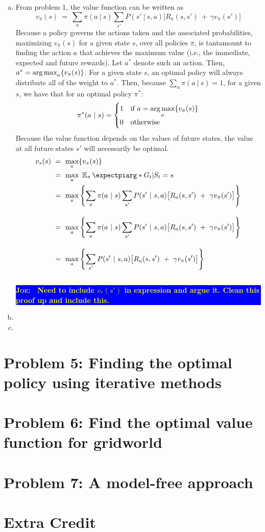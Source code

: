 \documentclass[twoside,11pt]{homework}
\DeclarePairedDelimiter{\2norm}{\lVert}{\rVert^2_2}
\newcommand{\1}[1]{\mathds{1}\left[#1\right]}
\newcommand{\expectpi}{\operatorname{\mathbb{E}_{\pi}}\expectpiarg}
\newcommand{\joe}[1]{\textcolor{yellow}{\colorbox{blue}{\parbox{15.5cm}{\textbf{\textsc{Joe}: \ #1}}}}}
\begin{document}
\begin{enumerate}[(a)]
\item  From problem 1, the value function can be written as $$v_{\pi}(s) \ = \ \sum_{a} \pi(a \ | \ s)\sum_{s'} P(s' \ | \ s, a)\big[R_a(s, s') \ + \ \gamma v_{\pi}(s') \big]$$
Because a policy governs the actions taken and the associated probabilities, maximizing $v_{\pi}(s)$ for a given state $s$, over all policies $\pi$, is tantamount to finding the action $a$ that achieves the maximum value (i.e., the immediate, expected and future rewards). Let $a^*$ denote such an action. Then, $a^* = \operatorname*{arg\,max}_a\{v_{\pi}(s)\}$. For a given state $s$, an optimal policy will always distribute all of the weight to $a^*$. Then, because $\sum_{a} \pi(a \ | \ s) = 1$, for a given $s$, we have that for an optimal policy $\pi^*$: $$\pi^*(a \ | \ s)  = \begin{cases} 1 & \text{if } a = \mathlarger{\argmax_a\{v_{\pi}(s)\}} \\ 0 & \text{otherwise} \end{cases}$$
Because the value function depends on the values of future states, the value at all future states $s'$ will necessarily be optimal.
\begin{align*}
v_*(s) \ & = \ \max_{\pi}\{v_{\pi}(s)\} \\
& = \ \max_{\pi} \ \expectpi*{G_t | S_t = s} \\
& = \ \max_{\pi} \left\lbrace \sum_{a} \pi(a \ | \ s)\sum_{s'} P(s' \ | \ s, a)\big[R_a(s, s') \ + \ \gamma v_{\pi}(s') \big]\right\rbrace\\[1em]
& = \ \max_{a} \left\lbrace \sum_{a} \pi(a \ | \ s)\sum_{s'} P(s' \ | \ s, a)\big[R_a(s, s') \ + \ \gamma v_{\pi}(s') \big]\right\rbrace\\[1em]
& = \ \max_{a} \left\lbrace \sum_{s'} P(s' \ | \ s, a)\big[R_a(s, s') \ + \ \gamma v_{\pi}(s') \big]\right\rbrace\\[1em]
\end{align*}
\joe{Need to include $v_*(s')$ in expression and argue it. Clean this proof up and include this.}

\item 


\item
\end{enumerate}

\section*{\large Problem 5: Finding the optimal policy using iterative methods}



\section*{\large Problem 6: Find the optimal value function for gridworld}


\section*{\large Problem 7: A model-free approach}


\section*{Extra Credit}
\end{document}
